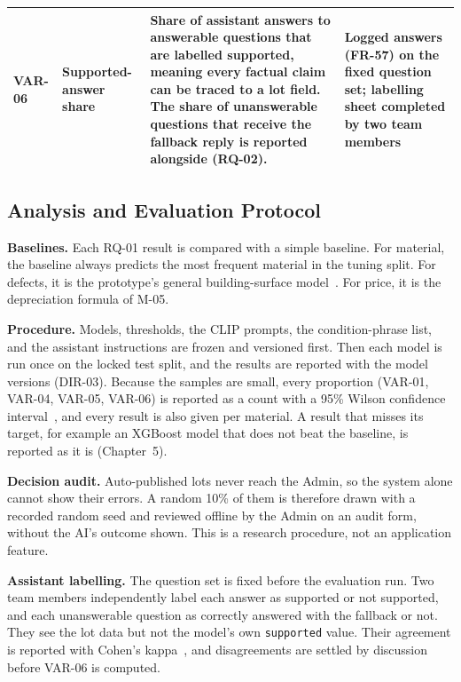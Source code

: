 {\begin{longtable}{@{}>{\raggedright\arraybackslash}p{}>{\raggedright\arraybackslash}p{}>{\raggedright\arraybackslash}p{}>{\raggedright\arraybackslash}p{}@{}}
VAR-06 & Supported-answer share & Share of assistant answers to answerable questions that are labelled supported, meaning every factual claim can be traced to a lot field. The share of unanswerable questions that receive the fallback reply is reported alongside (RQ-02). & Logged answers (FR-57) on the fixed question set; labelling sheet completed by two team members \\
\bottomrule
\end{longtable}
}

\subsection{Analysis and Evaluation Protocol}
\textbf{Baselines.} Each RQ-01 result is compared with a simple baseline. For material,
the baseline always predicts the most frequent material in the tuning split. For
defects, it is the prototype's general building-surface model~\citep{buildingsurfacedefect}.
For price, it is the depreciation formula of M-05.

\textbf{Procedure.} Models, thresholds, the CLIP prompts, the condition-phrase list,
and the assistant instructions are frozen and versioned first. Then each model is run
once on the locked test split, and the results are reported with the model versions
(DIR-03). Because the samples are small, every proportion (VAR-01, VAR-04, VAR-05,
VAR-06) is reported as a count with a 95\% Wilson confidence
interval~\citep{wilson1927interval}, and every result is also given per material. A
result that misses its target, for example an XGBoost model that does not beat the
baseline, is reported as it is (Chapter~5).

\textbf{Decision audit.} Auto-published lots never reach the Admin, so the system alone
cannot show their errors. A random 10\% of them is therefore drawn with a recorded
random seed and reviewed offline by the Admin on an audit form, without the AI's
outcome shown. This is a research procedure, not an application feature.

\textbf{Assistant labelling.} The question set is fixed before the evaluation run.
Two team members independently label each answer as supported or not supported, and
each unanswerable question as correctly answered with the fallback or not. They see
the lot data but not the model's own \texttt{supported} value. Their agreement is
reported with Cohen's kappa~\citep{cohen1960kappa}, and disagreements are settled by
discussion before VAR-06 is computed.

